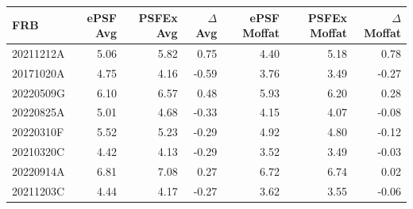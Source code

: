 \begin{tabular}{lrrrrrr}
\hline
 FRB & ePSF Avg & PSFEx Avg & $\Delta$ Avg & ePSF Moffat & PSFEx Moffat & $\Delta$ Moffat \\
\hline
 20211212A & 5.06 & 5.82 & 0.75 & 4.40 & 5.18 & 0.78 \\
 20171020A & 4.75 & 4.16 & -0.59 & 3.76 & 3.49 & -0.27 \\
 20220509G & 6.10 & 6.57 & 0.48 & 5.93 & 6.20 & 0.28 \\
 20220825A & 5.01 & 4.68 & -0.33 & 4.15 & 4.07 & -0.08 \\
 20220310F & 5.52 & 5.23 & -0.29 & 4.92 & 4.80 & -0.12 \\
 20210320C & 4.42 & 4.13 & -0.29 & 3.52 & 3.49 & -0.03 \\
 20220914A & 6.81 & 7.08 & 0.27 & 6.72 & 6.74 & 0.02 \\
 20211203C & 4.44 & 4.17 & -0.27 & 3.62 & 3.55 & -0.06 \\
\hline
\end{tabular}